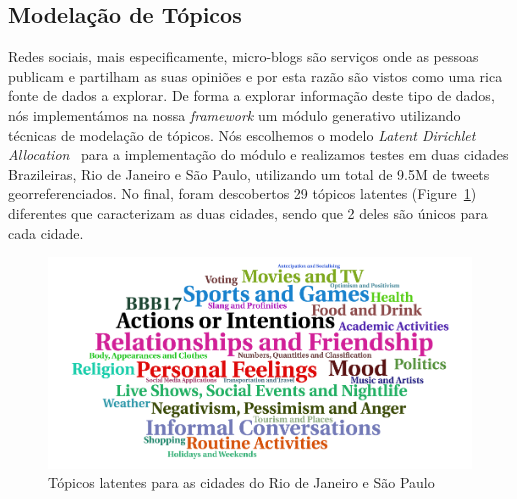 \documentclass[9pt,a4paper]{extarticle}
\begin{document}
\begin{multicols}{2}
\subsection{Modelação de Tópicos}
Redes sociais, mais especificamente, micro-blogs são serviços onde as pessoas publicam e partilham as suas opiniões e por esta razão são vistos como uma rica fonte de dados a explorar. De forma a explorar informação deste tipo de dados, nós implementámos na nossa \emph{framework} um módulo generativo utilizando técnicas de modelação de tópicos. Nós escolhemos o modelo \emph{Latent Dirichlet Allocation}~\cite{blei2003latent} para a implementação do módulo e realizamos testes em duas cidades Brazileiras, Rio de Janeiro e São Paulo, utilizando um total de 9.5M de tweets georreferenciados. No final, foram descobertos 29 tópicos latentes (Figure~\ref{fig:topics}) diferentes que caracterizam as duas cidades, sendo que 2 deles são únicos para cada cidade.

\begin{figure}[H]
	\centerline{\includegraphics[scale=.16]{topics.png}}
	\caption{Tópicos latentes para as cidades do Rio de Janeiro e São Paulo}  
	\label{fig:topics}
\end{figure}


\end{multicols}
\end{document}
